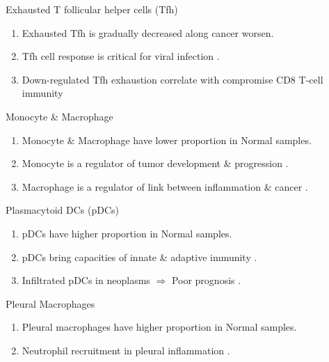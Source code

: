 \documentclass{beamer}
\begin{document}
\begin{frame}[allowframebreaks]
        \begin{block}{Exhausted T follicular helper cells (Tfh)}
            \begin{enumerate}
                \item Exhausted Tfh is gradually decreased along cancer worsen.
                \item Tfh cell response is critical for viral infection \cite{Tfh-1, Tfh-2}.
                \item Down-regulated Tfh exhaustion correlate with compromise CD8 T-cell immunity \cite{Tfh-3}
            \end{enumerate}
        \end{block}

        \begin{block}{Monocyte \& Macrophage}
            \begin{enumerate}
                \item Monocyte \& Macrophage have lower proportion in Normal samples.
                \item Monocyte is a regulator of tumor development \& progression \cite{monocyte-1}.
                \item Macrophage is a regulator of link between inflammation \& cancer \cite{macrophage-1}.
            \end{enumerate}
        \end{block}

        \begin{block}{Plasmacytoid DCs (pDCs)}
            \begin{enumerate}
                \item pDCs have higher proportion in Normal samples.
                \item pDCs bring capacities of innate \& adaptive immunity \cite{pDCs-1}.
                \item Infiltrated pDCs in neoplasms $\Rightarrow$ Poor prognosis \cite{pDCs-2}.
            \end{enumerate}
        \end{block}

        \begin{block}{Pleural Macrophages}
            \begin{enumerate}
                \item Pleural macrophages have higher proportion in Normal samples.
                \item Neutrophil recruitment in pleural inflammation \cite{PleuralMac-1}.
            \end{enumerate}
        \end{block}


\end{frame}
\end{document}

